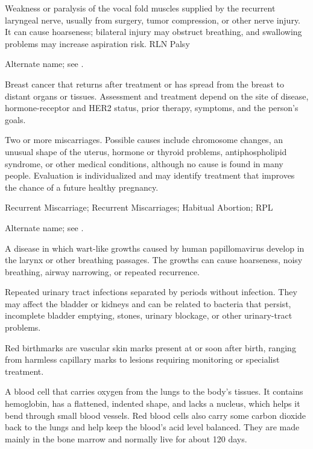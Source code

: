  Weakness or paralysis of the vocal fold muscles supplied by the recurrent laryngeal nerve, usually from surgery, tumor compression, or other nerve injury. It can cause hoarseness; bilateral injury may obstruct breathing, and swallowing problems may increase aspiration risk.
\synonyms
RLN Palsy

 Alternate name; see .

 Breast cancer that returns after treatment or has spread from the breast to distant organs or tissues. Assessment and treatment depend on the site of disease, hormone-receptor and HER2 status, prior therapy, symptoms, and the person's goals.

 Two or more miscarriages. Possible causes include chromosome changes, an unusual shape of the uterus, hormone or thyroid problems, antiphospholipid syndrome, or other medical conditions, although no cause is found in many people. Evaluation is individualized and may identify treatment that improves the chance of a future healthy pregnancy.

\synonyms
Recurrent Miscarriage; Recurrent Miscarriages; Habitual Abortion; RPL

 Alternate name; see .

 A disease in which wart-like growths caused by human papillomavirus develop in the larynx or other breathing passages. The growths can cause hoarseness, noisy breathing, airway narrowing, or repeated recurrence.

 Repeated urinary tract infections separated by periods without infection. They may affect the bladder or kidneys and can be related to bacteria that persist, incomplete bladder emptying, stones, urinary blockage, or other urinary-tract problems.

 Red birthmarks are vascular skin marks present at or soon after birth, ranging from harmless capillary marks to lesions requiring monitoring or specialist treatment.

 A blood cell that carries oxygen from the lungs to the body's tissues. It contains hemoglobin, has a flattened, indented shape, and lacks a nucleus, which helps it bend through small blood vessels. Red blood cells also carry some carbon dioxide back to the lungs and help keep the blood's acid level balanced. They are made mainly in the bone marrow and normally live for about 120 days.

